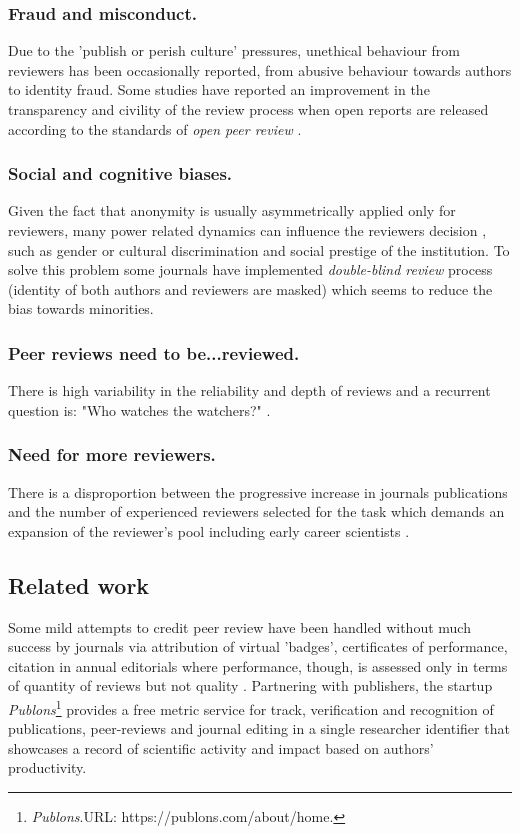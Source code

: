 \documentclass[runningheads]{llncs}
\begin{document}
\subsubsection{Fraud and misconduct.} Due to the 'publish or perish culture' pressures, unethical behaviour from reviewers has been occasionally reported, from abusive behaviour towards authors \cite{Smith2006,tragedy-reviewers} to identity fraud. Some studies have reported an improvement in the transparency and civility of the review process when open reports are released according to the standards of \emph{open peer review} \cite{PeerRev-NatComm}.
\subsubsection{Social and cognitive biases.} Given the fact that anonymity is usually asymmetrically applied only for reviewers, many power related dynamics can influence the reviewers decision \cite{Tennant2017-F1000R}, such as gender or cultural discrimination and social prestige of the institution. To solve this problem some journals have implemented \emph{double-blind review} process (identity of both authors and reviewers are masked) which seems to reduce the bias towards minorities.
\subsubsection{Peer reviews need to be...reviewed.} There is high variability in the reliability and depth of reviews and a recurrent question is: "Who watches the watchers?" \cite{Tennant2017-F1000R}.
\subsubsection{Need for more reviewers.} There is a disproportion between the progressive increase in journals publications and the number of experienced reviewers selected for the task which demands an expansion of the reviewer's pool including early career scientists \cite{tragedy-reviewers,Warne-RewRev}.

\subsection{Related work} Some mild attempts to credit peer review have been handled without much success by journals via attribution of virtual 'badges', certificates of performance, citation in annual editorials \cite{Tennant2017-F1000R} where performance, though, is assessed only in terms of quantity of reviews but not quality \cite{Warne-RewRev}.
\newline Partnering with publishers, the startup \emph{Publons}\footnote[1]{\emph{Publons}.\textsc{URL:} https://publons.com/about/home.} provides a free metric service for track, verification and recognition of publications, peer-reviews and journal editing in a single researcher identifier that showcases a record of scientific activity and impact based on authors' productivity.
\end{document}
